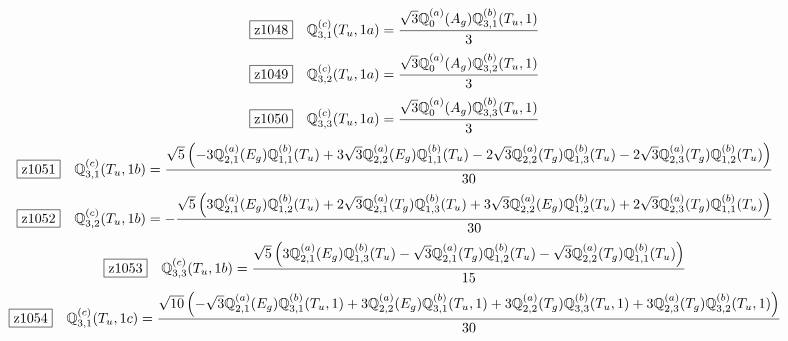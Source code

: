 \documentclass[fleqn,10pt,landscape]{jsarticle}
\begin{document}
\begin{dmath*}
\hspace*{3mm}\fbox{z1048}\quad \mathbb{Q}_{3,1}^{(c)}(T_{u},1a)=\frac{\sqrt{3} \mathbb{Q}_{0}^{(a)}(A_{g}) \mathbb{Q}_{3,1}^{(b)}(T_{u},1)}{3}
\end{dmath*}
\begin{dmath*}
\hspace*{3mm}\fbox{z1049}\quad \mathbb{Q}_{3,2}^{(c)}(T_{u},1a)=\frac{\sqrt{3} \mathbb{Q}_{0}^{(a)}(A_{g}) \mathbb{Q}_{3,2}^{(b)}(T_{u},1)}{3}
\end{dmath*}
\begin{dmath*}
\hspace*{3mm}\fbox{z1050}\quad \mathbb{Q}_{3,3}^{(c)}(T_{u},1a)=\frac{\sqrt{3} \mathbb{Q}_{0}^{(a)}(A_{g}) \mathbb{Q}_{3,3}^{(b)}(T_{u},1)}{3}
\end{dmath*}
\begin{dmath*}
\hspace*{3mm}\fbox{z1051}\quad \mathbb{Q}_{3,1}^{(c)}(T_{u},1b)=\frac{\sqrt{5} \left(- 3 \mathbb{Q}_{2,1}^{(a)}(E_{g}) \mathbb{Q}_{1,1}^{(b)}(T_{u}) + 3 \sqrt{3} \mathbb{Q}_{2,2}^{(a)}(E_{g}) \mathbb{Q}_{1,1}^{(b)}(T_{u}) - 2 \sqrt{3} \mathbb{Q}_{2,2}^{(a)}(T_{g}) \mathbb{Q}_{1,3}^{(b)}(T_{u}) - 2 \sqrt{3} \mathbb{Q}_{2,3}^{(a)}(T_{g}) \mathbb{Q}_{1,2}^{(b)}(T_{u})\right)}{30}
\end{dmath*}
\begin{dmath*}
\hspace*{3mm}\fbox{z1052}\quad \mathbb{Q}_{3,2}^{(c)}(T_{u},1b)=- \frac{\sqrt{5} \left(3 \mathbb{Q}_{2,1}^{(a)}(E_{g}) \mathbb{Q}_{1,2}^{(b)}(T_{u}) + 2 \sqrt{3} \mathbb{Q}_{2,1}^{(a)}(T_{g}) \mathbb{Q}_{1,3}^{(b)}(T_{u}) + 3 \sqrt{3} \mathbb{Q}_{2,2}^{(a)}(E_{g}) \mathbb{Q}_{1,2}^{(b)}(T_{u}) + 2 \sqrt{3} \mathbb{Q}_{2,3}^{(a)}(T_{g}) \mathbb{Q}_{1,1}^{(b)}(T_{u})\right)}{30}
\end{dmath*}
\begin{dmath*}
\hspace*{3mm}\fbox{z1053}\quad \mathbb{Q}_{3,3}^{(c)}(T_{u},1b)=\frac{\sqrt{5} \left(3 \mathbb{Q}_{2,1}^{(a)}(E_{g}) \mathbb{Q}_{1,3}^{(b)}(T_{u}) - \sqrt{3} \mathbb{Q}_{2,1}^{(a)}(T_{g}) \mathbb{Q}_{1,2}^{(b)}(T_{u}) - \sqrt{3} \mathbb{Q}_{2,2}^{(a)}(T_{g}) \mathbb{Q}_{1,1}^{(b)}(T_{u})\right)}{15}
\end{dmath*}
\begin{dmath*}
\hspace*{3mm}\fbox{z1054}\quad \mathbb{Q}_{3,1}^{(c)}(T_{u},1c)=\frac{\sqrt{10} \left(- \sqrt{3} \mathbb{Q}_{2,1}^{(a)}(E_{g}) \mathbb{Q}_{3,1}^{(b)}(T_{u},1) + 3 \mathbb{Q}_{2,2}^{(a)}(E_{g}) \mathbb{Q}_{3,1}^{(b)}(T_{u},1) + 3 \mathbb{Q}_{2,2}^{(a)}(T_{g}) \mathbb{Q}_{3,3}^{(b)}(T_{u},1) + 3 \mathbb{Q}_{2,3}^{(a)}(T_{g}) \mathbb{Q}_{3,2}^{(b)}(T_{u},1)\right)}{30}
\end{dmath*}
\end{document}
